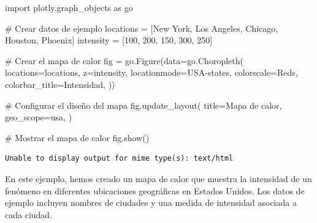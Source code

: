 \documentclass[
  a4paper,
]{article}
\newenvironment{Shaded}{}{}
\newcommand{\CommentTok}[1]{\textcolor[rgb]{0.42,0.45,0.49}{#1}}
\newcommand{\DecValTok}[1]{\textcolor[rgb]{0.00,0.36,0.77}{#1}}
\newcommand{\ImportTok}[1]{\textcolor[rgb]{0.01,0.18,0.38}{#1}}
\newcommand{\NormalTok}[1]{\textcolor[rgb]{0.14,0.16,0.18}{#1}}
\newcommand{\OperatorTok}[1]{\textcolor[rgb]{0.14,0.16,0.18}{#1}}
\newcommand{\StringTok}[1]{\textcolor[rgb]{0.01,0.18,0.38}{#1}}
\begin{document}
\begin{Shaded}
\begin{Highlighting}[]
\ImportTok{import}\NormalTok{ plotly.graph\_objects }\ImportTok{as}\NormalTok{ go}

\CommentTok{\# Crear datos de ejemplo}
\NormalTok{locations }\OperatorTok{=}\NormalTok{ [}\StringTok{\textquotesingle{}New York\textquotesingle{}}\NormalTok{, }\StringTok{\textquotesingle{}Los Angeles\textquotesingle{}}\NormalTok{, }\StringTok{\textquotesingle{}Chicago\textquotesingle{}}\NormalTok{, }\StringTok{\textquotesingle{}Houston\textquotesingle{}}\NormalTok{, }\StringTok{\textquotesingle{}Phoenix\textquotesingle{}}\NormalTok{]}
\NormalTok{intensity }\OperatorTok{=}\NormalTok{ [}\DecValTok{100}\NormalTok{, }\DecValTok{200}\NormalTok{, }\DecValTok{150}\NormalTok{, }\DecValTok{300}\NormalTok{, }\DecValTok{250}\NormalTok{]}

\CommentTok{\# Crear el mapa de calor}
\NormalTok{fig }\OperatorTok{=}\NormalTok{ go.Figure(data}\OperatorTok{=}\NormalTok{go.Choropleth(}
\NormalTok{    locations}\OperatorTok{=}\NormalTok{locations,}
\NormalTok{    z}\OperatorTok{=}\NormalTok{intensity,}
\NormalTok{    locationmode}\OperatorTok{=}\StringTok{\textquotesingle{}USA{-}states\textquotesingle{}}\NormalTok{,}
\NormalTok{    colorscale}\OperatorTok{=}\StringTok{\textquotesingle{}Reds\textquotesingle{}}\NormalTok{,}
\NormalTok{    colorbar\_title}\OperatorTok{=}\StringTok{\textquotesingle{}Intensidad\textquotesingle{}}\NormalTok{,}
\NormalTok{))}

\CommentTok{\# Configurar el diseño del mapa}
\NormalTok{fig.update\_layout(}
\NormalTok{    title}\OperatorTok{=}\StringTok{\textquotesingle{}Mapa de calor\textquotesingle{}}\NormalTok{,}
\NormalTok{    geo\_scope}\OperatorTok{=}\StringTok{\textquotesingle{}usa\textquotesingle{}}\NormalTok{,}
\NormalTok{)}

\CommentTok{\# Mostrar el mapa de calor}
\NormalTok{fig.show()}
\end{Highlighting}
\end{Shaded}

\begin{verbatim}
Unable to display output for mime type(s): text/html
\end{verbatim}

En este ejemplo, hemos creado un mapa de calor que muestra la intensidad
de un fenómeno en diferentes ubicaciones geográficas en Estados Unidos.
Los datos de ejemplo incluyen nombres de ciudades y una medida de
intensidad asociada a cada ciudad.
\end{document}
